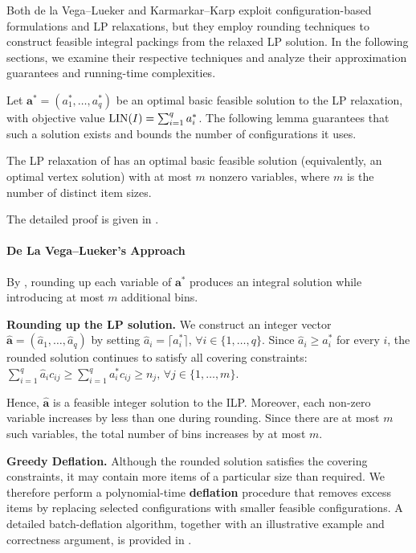 Both de la Vega--Lueker and Karmarkar--Karp
exploit configuration-based formulations and
LP relaxations, but they employ rounding techniques to
construct feasible integral packings from the relaxed 
LP solution. In the following sections, we examine their
respective techniques and analyze their
approximation guarantees and running-time
complexities.

Let $\mathbf{a}^*=(a_1^*,\ldots,a_q^*)$ be an optimal
basic feasible solution to the LP relaxation, with
objective value $\operatorname{LIN}(I)=\sum_{i=1}^{q}a_i^*$. The following
lemma guarantees that such a solution exists and bounds
the number of configurations it uses.

\begin{lemma}
\label{lem:lp_nonzero_variables}
The LP relaxation of  has an optimal
basic feasible solution (equivalently, an optimal vertex solution)
with at most $m$ nonzero variables, where $m$ is the number
of distinct item sizes.
\end{lemma}

The detailed proof is given in .

\paragraph{De La Vega--Lueker's Approach}

By , rounding up each variable
of $\mathbf{a}^*$ produces an integral solution while introducing
at most $m$ additional bins.

\textbf{Rounding up the LP solution.}
We construct an integer vector
$\hat{\mathbf{a}}=(\hat{a}_1,\ldots,\hat{a}_q)$
by setting $\hat{a}_i=\lceil a_i^*\rceil,\,\forall i\in\{1,\ldots,q\}.$
Since $\hat{a}_i\geq a_i^*$ for every $i$,
the rounded solution continues to satisfy all
covering constraints: $\sum_{i=1}^{q}\hat{a}_i c_{ij}\geq\sum_{i=1}^{q}a_i^*c_{ij}
\geq n_j,\, \forall j\in\{1,\ldots,m\}.$

Hence, $\hat{\mathbf{a}}$ is a feasible integer
solution to the ILP. Moreover, each non-zero
variable increases by less than one during
rounding. Since there are at most $m$ such
variables, the total number of bins increases
by at most $m$.


\textbf{Greedy Deflation.}
Although the rounded solution satisfies the
covering constraints, it may contain more items
of a particular size than required. We therefore perform a polynomial-time \textbf{deflation} procedure that removes excess items by replacing selected configurations with smaller feasible
configurations. A detailed batch-deflation algorithm, together
with an illustrative example and correctness
argument, is provided in .

